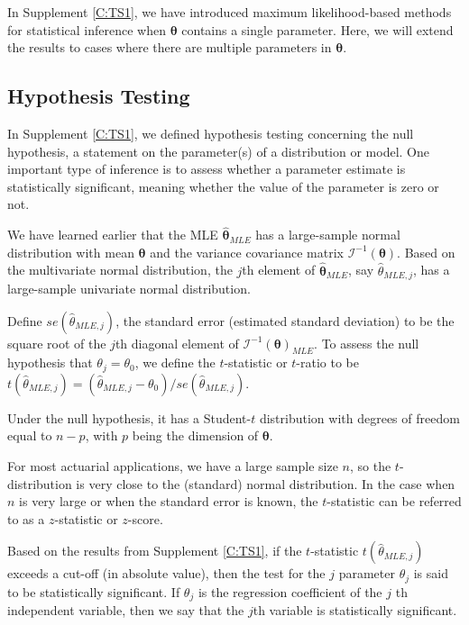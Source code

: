 \documentclass[]{book}
\theoremstyle{definition}
\theoremstyle{definition}
\theoremstyle{definition}
\theoremstyle{remark}
\begin{document}
In Supplement \ref{C:TS1}, we have introduced maximum likelihood-based
methods for statistical inference when \(\boldsymbol\theta\) contains a
single parameter. Here, we will extend the results to cases where there
are multiple parameters in \(\boldsymbol\theta\).

\subsection{Hypothesis Testing}\label{hypothesis-testing}

In Supplement \ref{C:TS1}, we defined hypothesis testing concerning the
null hypothesis, a statement on the parameter(s) of a distribution or
model. One important type of inference is to assess whether a parameter
estimate is statistically significant, meaning whether the value of the
parameter is zero or not.

We have learned earlier that the MLE \(\hat{\boldsymbol{\theta}}_{MLE}\)
has a large-sample normal distribution with mean \(\boldsymbol \theta\)
and the variance covariance matrix
\(\mathcal{I}^{-1}(\boldsymbol \theta)\). Based on the multivariate
normal distribution, the \(j\)th element of
\(\hat{\boldsymbol{\theta}}_{MLE}\), say \(\hat{\theta}_{MLE,j}\), has a
large-sample univariate normal distribution.

Define \(se(\hat{\theta}_{MLE,j})\), the standard error (estimated
standard deviation) to be the square root of the \(j\)th diagonal
element of \(\mathcal{I}^{-1}(\boldsymbol \theta)_{MLE}\). To assess the
null hypothesis that \(\theta_j=\theta_0\), we define the
\(t\)-statistic or \(t\)-ratio to be
\(t(\hat{\theta}_{MLE,j})=(\hat{\theta}_{MLE,j}-\theta_0)/se(\hat{\theta}_{MLE,j})\).

Under the null hypothesis, it has a Student-\(t\) distribution with
degrees of freedom equal to \(n-p\), with \(p\) being the dimension of
\(\boldsymbol{\theta}\).

For most actuarial applications, we have a large sample size \(n\), so
the \(t\)-distribution is very close to the (standard) normal
distribution. In the case when \(n\) is very large or when the standard
error is known, the \(t\)-statistic can be referred to as a
\(z\)-statistic or \(z\)-score.

Based on the results from Supplement \ref{C:TS1}, if the \(t\)-statistic
\(t(\hat{\theta}_{MLE,j})\) exceeds a cut-off (in absolute value), then
the test for the \(j\) parameter \(\theta_j\) is said to be
statistically significant. If \(\theta_j\) is the regression coefficient
of the \(j\) th independent variable, then we say that the \(j\)th
variable is statistically significant.
\end{document}
